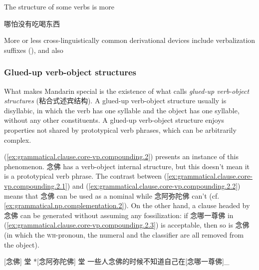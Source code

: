 \documentclass[UTF8, a4paper, oneside, scheme=plain, 12pt]{ctexrep}
\newcommand*{\citepages}[1]{pp.~{#1}}
\newcommand*{\term}[1]{\emph{#1}}
\newcommand*{\category}[1]{\textsc{#1}}
\begin{document}
The structure of some verbs is more 

\begin{exe}
    \ex\label{ex:grammatical.clause.core-vp.compounding.coordination.1} 哪怕没有吃喝东西
\end{exe}

More or less cross-linguistically common derivational devices include verbalization suffixes 
(),
and also


\subsubsection{Glued-up verb-object structures}\label{sec:grammatical.clause.core-vp.derivation.glue}

What makes Mandarin special is the existence of what \citet[\citepages{128-9}]{zhudexigrammar}
calls \term{glued-up verb-object structures} (粘合式述宾结构).
A glued-up verb-object structure usually is disyllabic,
in which the verb has one syllable and the object has one syllable,
without any other constituents.
A glued-up verb-object structure enjoys properties not shared by prototypical verb phrases,
which can be arbitrarily complex.

(\ref{ex:grammatical.clause.core-vp.compounding.2}) presents an instance of this phenomenon.
念佛 has a verb-object internal structure,
but this doesn't mean it is a prototypical verb phrase.
The contrast between (\ref{ex:grammatical.clause.core-vp.compounding.2.1})
and (\ref{ex:grammatical.clause.core-vp.compounding.2.2}) means that 
念佛 can be used as a nominal while 念阿弥陀佛 can't (cf. \ref{ex:grammatical.np.complementation.2}).
On the other hand, a clause headed by 念佛 can be generated without assuming any fossilization:
if 念哪一尊佛 in (\ref{ex:grammatical.clause.core-vp.compounding.2.3}) is acceptable,
then so is 念佛 (in which the \category{wh}-pronoun, the numeral and the classifier
are all removed from the object).

\begin{exe}
    \ex\label{ex:grammatical.clause.core-vp.compounding.2}
    \begin{xlist}
        \ex\label{ex:grammatical.clause.core-vp.compounding.2.1} {} [念佛] 堂 
        \ex\label{ex:grammatical.clause.core-vp.compounding.2.2} {} *[念阿弥陀佛] 堂 
        \ex\label{ex:grammatical.clause.core-vp.compounding.2.3} 一些人念佛的时候不知道自己在[念哪一尊佛]_{}
    \end{xlist}
\end{exe}
\end{document}
